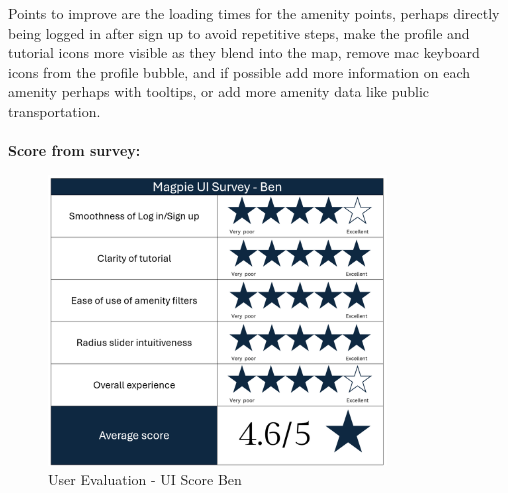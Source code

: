 Points to improve are the loading times for the amenity points, perhaps  directly being logged in after sign up to avoid repetitive steps, make the profile and tutorial icons more visible as they blend into the map, remove mac keyboard icons from the profile bubble, and if possible add more information on each amenity perhaps with tooltips, or add more amenity data like public transportation.\\\\
\textbf{Score from survey: }
\begin{figure}
    \centering
    \includegraphics[width=0.8\textwidth]{images/survey-ben.png}
    \caption{User Evaluation - UI Score Ben}
\end{figure}

\newpage
